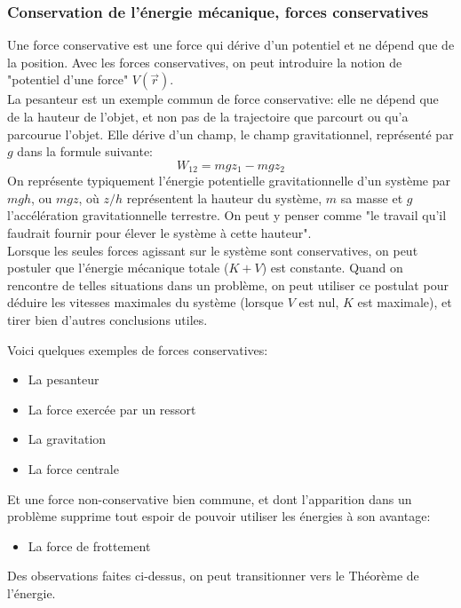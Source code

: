 \documentclass{article}
\numberwithin{equation}{section}
\begin{document}
\subsubsection{Conservation de l'énergie mécanique, forces conservatives}
Une force conservative est une force qui dérive d'un potentiel et ne dépend que de la position. Avec les forces conservatives, on peut introduire la notion de "potentiel d'une force" \(V(\vec r)\). \\

La pesanteur est un exemple commun de force conservative: elle ne dépend que de la hauteur de l'objet, et non pas de la trajectoire que parcourt ou qu'a parcourue l'objet. Elle dérive d'un champ, le champ gravitationnel, représenté par \(g\) dans la formule suivante:
\begin{equation}
	W_{12} = mgz_1 - mgz_2
\end{equation}
On représente typiquement l'énergie potentielle gravitationnelle d'un système par \(mgh\), ou \(mgz\), où \(z/h\) représentent la hauteur du système, \(m\) sa masse et \(g\) l'accélération gravitationnelle terrestre. On peut y penser comme "le travail qu'il faudrait fournir pour élever le système à cette hauteur". \\

Lorsque les seules forces agissant sur le système sont conservatives, on peut postuler que l'énergie mécanique totale (\(K + V\)) est constante. Quand on rencontre de telles situations dans un problème, on peut utiliser ce postulat pour déduire les vitesses maximales du système (lorsque \(V\) est nul, \(K\) est maximale), et tirer bien d'autres conclusions utiles.

Voici quelques exemples de forces conservatives:
\begin{itemize}
	\item La pesanteur
	\item La force exercée par un ressort
	\item La gravitation
	\item La force centrale %
\end{itemize}
Et une force non-conservative bien commune, et dont l'apparition dans un problème supprime tout espoir de pouvoir utiliser les énergies à son avantage:
\begin{itemize}
	\item La force de frottement
\end{itemize}

Des observations faites ci-dessus, on peut transitionner vers le Théorème de l'énergie.
\end{document}

